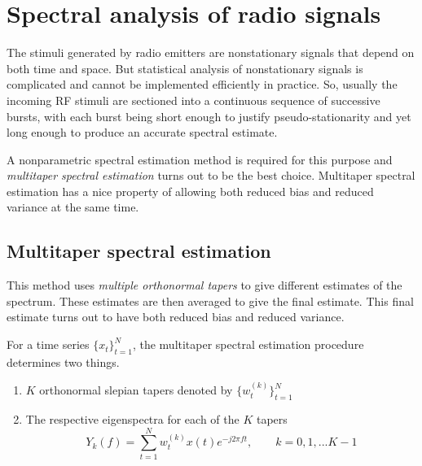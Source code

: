 \documentclass[12pt]{article}
\begin{document}
\section{Spectral analysis of radio signals}

The stimuli generated by radio emitters are nonstationary signals that depend on both time and space. But statistical analysis of nonstationary signals is complicated and cannot be implemented efficiently in practice. So, usually the incoming RF stimuli are sectioned into a continuous sequence of successive bursts, with each burst being short enough to justify pseudo-stationarity and yet long enough to produce an accurate spectral estimate\cite{haykin2005}.


A nonparametric spectral estimation method is required for this purpose and \emph{multitaper spectral estimation}\cite{thomson1982, percival1993} turns out to be the best choice. Multitaper spectral estimation has a nice property of allowing both reduced bias and reduced variance at the same time.

\subsection*{Multitaper spectral estimation}
This method uses \emph{multiple orthonormal tapers}\cite{thomson1982} to give different estimates of the spectrum. These estimates are then averaged to give the final estimate. This final estimate turns out to have both reduced bias and reduced variance\cite{thomson1982, percival1993}.


For a time series $\{x_t\}_{t=1}^N$, the multitaper spectral estimation procedure determines two things.
\begin{enumerate}
    \item $K$ orthonormal slepian tapers denoted by $\{w_t^{(k)}\}_{t=1}^{N}$
    \item The respective eigenspectra for each of the $K$ tapers
\begin{equation}
   Y_k(f) = \sum_{t=1}^N w_t^{(k)} x(t) e^{-j2\pi{}ft}, \qquad k = 0, 1, ...K-1
\end{equation}
\end{enumerate}
\end{document}
